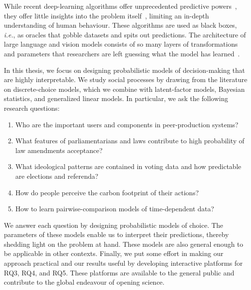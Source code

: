 While recent deep-learning algorithms offer unprecedented predictive powers~\citep{lecun2015deep}, they offer little insights into the problem itself~\citep{rudin2019stop}, limiting an in-depth understanding of human behaviour.
These algorithms are used as black boxes, \textit{i.e.}, as oracles that gobble datasets and spits out predictions.
The architecture of large language and vision models consists of so many layers of transformations and parameters that researchers are left guessing what the model has learned~\citep{fong2017interpretable,guidotti2018survey,olah2020zoom,hilton2020understanding}.

In this thesis, we focus on designing probabilistic models of decision-making that are highly interpretable.
We study social processes by drawing from the literature on discrete-choice models, which we combine with latent-factor models, Bayesian statistics, and generalized linear models.
In particular, we ask the following research questions:
\begin{enumerate}[
		leftmargin=1.5cm,
		topsep=0cm,
		parsep=0.0pt,
		itemsep=1.5pt,
		label=\textbf{RQ\arabic*}
	]
	\item Who are the important users and components in peer-production systems?
	\item What features of parliamentarians and laws contribute to high probability of law amendments acceptance?
	\item What ideological patterns are contained in voting data and how predictable are elections and referenda?
	\item How do people perceive the carbon footprint of their actions?
	\item How to learn pairwise-comparison models of time-dependent data?
\end{enumerate}
We answer each question by designing probabilistic models of choice.
The parameters of these models enable us to interpret their predictions, thereby shedding light on the problem at hand.
These models are also general enough to be applicable in other contexts.
Finally, we put some effort in making our approach practical and our results useful by developing interactive platforms for RQ3, RQ4, and RQ5.
These platforms are available to the general public and contribute to the global endeavour of opening science.
